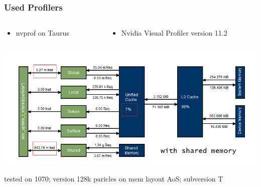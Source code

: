 \documentclass[aspectratio=169]{beamer}
\begin{document}
\begin{frame}
	\frametitle{Used Profilers}
	\begin{columns}
	\begin{column}{0.3\textwidth}
		\begin{itemize}
			\item nvprof on Taurus
		\end{itemize}
	\end{column}
	
	\begin{column}{0.5\textwidth}
		\begin{itemize}
			\item Nvidia Visual Profiler version 11.2
		\end{itemize}
	\end{column}
	\end{columns}
	\medskip
	\includegraphics[scale=0.50]{resources/128-1070-aos-update-t-shared.png}
	
	\small tested on 1070; version 128k paricles on mem layout AoS; subversion T
\end{frame}
\end{document}
